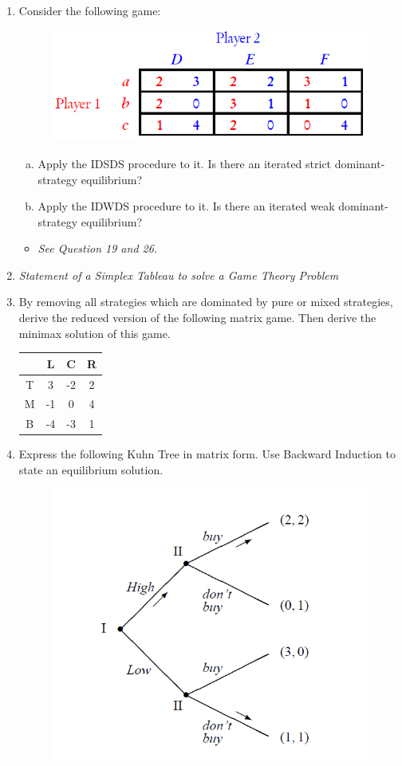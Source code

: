 \documentclass[]{report}
\begin{document}
\begin{enumerate}
\newpage
\item Consider the following game: \begin{figure}[h!]
	\centering
	\includegraphics[width=0.45\linewidth]{Question27}
\end{figure}
\begin{enumerate}[(a)]
\item Apply the IDSDS procedure to it. Is there an iterated strict dominant-strategy
equilibrium?
\item  Apply the IDWDS procedure to it. Is there an iterated weak dominant-strategy
equilibrium?
\end{enumerate}

\begin{itemize}
	\item \textit{See Question 19 and 26.}
	
\end{itemize}	
\item \textit{Statement of a Simplex Tableau to solve a Game Theory Problem}
\item By removing all strategies which are dominated by pure or mixed strategies,
derive the reduced version of the following matrix game. Then derive the minimax solution of this game.

\begin{center}
	\begin{tabular}{|c|c|c|c|} \hline 
		&    L  &  C  & R \\ \hline 
		T  &   3 &  -2 &  2 \\ \hline
		M  &    -1  &   0  &  4 \\ \hline
		B  &   -4  &    -3  &   1 \\ \hline
	\end{tabular}
\end{center}

\item Express the following Kuhn Tree in matrix form. 
Use Backward Induction to state an equilibrium solution.
\begin{figure}[h!]
\centering
\includegraphics[width=0.4\linewidth]{Q30}

\end{figure}
\end{enumerate}
\end{document}
